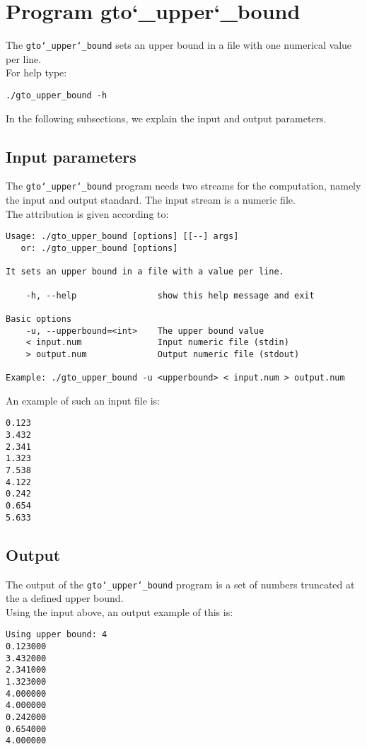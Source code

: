 \section{Program gto\char`_upper\char`_bound}
The \texttt{gto\char`_upper\char`_bound} sets an upper bound in a file with one numerical value per line.\\
For help type:
\begin{lstlisting}
./gto_upper_bound -h
\end{lstlisting}
In the following subsections, we explain the input and output parameters.

\subsection*{Input parameters}

The \texttt{gto\char`_upper\char`_bound} program needs two streams for the computation, namely the input and output standard. The input stream is a numeric file.\\
The attribution is given according to:
\begin{lstlisting}
Usage: ./gto_upper_bound [options] [[--] args]
   or: ./gto_upper_bound [options]

It sets an upper bound in a file with a value per line.

    -h, --help                show this help message and exit

Basic options
    -u, --upperbound=<int>    The upper bound value
    < input.num               Input numeric file (stdin)
    > output.num              Output numeric file (stdout)

Example: ./gto_upper_bound -u <upperbound> < input.num > output.num
\end{lstlisting}
An example of such an input file is:
\begin{lstlisting}
0.123
3.432
2.341
1.323
7.538
4.122
0.242
0.654
5.633
\end{lstlisting}

\subsection*{Output}
The output of the \texttt{gto\char`_upper\char`_bound} program is a set of numbers truncated at the a defined upper bound.\\
Using the input above, an output example of this is:
\begin{lstlisting}
Using upper bound: 4
0.123000
3.432000
2.341000
1.323000
4.000000
4.000000
0.242000
0.654000
4.000000
\end{lstlisting}